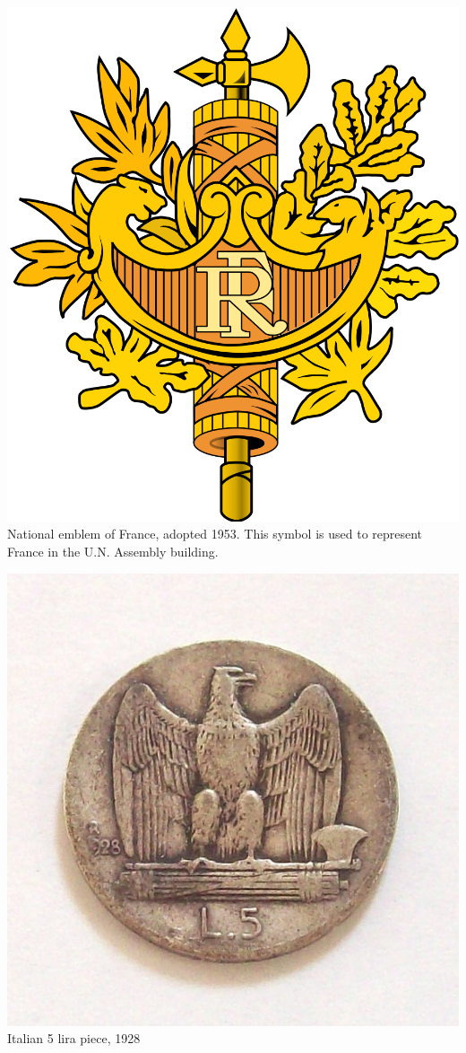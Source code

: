 \begin{frame}
    \centering
    \includegraphics[height=.8\textheight]{img/fasces/french-republic-symbol.png} \\
    National emblem of France, adopted 1953. This symbol is used to represent France in the U.N. Assembly building. \\
\end{frame}
\begin{frame}
    \centering
    \includegraphics[height=.8\textheight]{img/fasces/italy-fasces-coin.jpg} \\
    Italian 5 lira piece, 1928 \\
\end{frame}


